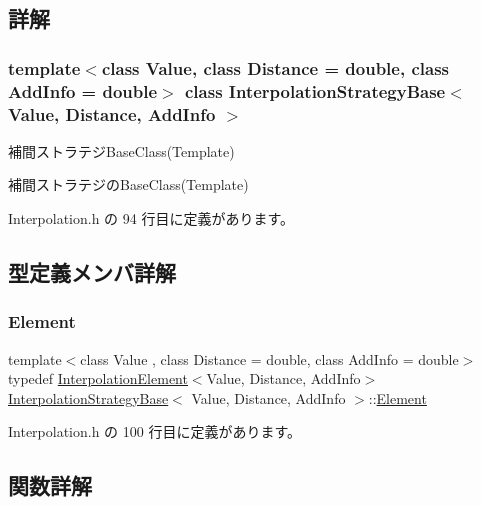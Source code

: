 \subsection{詳解}
\subsubsection*{template$<$class Value, class Distance = double, class Add\+Info = double$>$\newline
class Interpolation\+Strategy\+Base$<$ Value, Distance, Add\+Info $>$}

補間ストラテジ\+Base\+Class(\+Template) 

補間ストラテジの\+Base\+Class(\+Template) 

 Interpolation.\+h の 94 行目に定義があります。



\subsection{型定義メンバ詳解}
\mbox{\label{class_interpolation_strategy_base_abddda7a257538a53ad6030db831aab86}} 
\subsubsection{\texorpdfstring{Element}{Element}}
{\footnotesize\ttfamily template$<$class Value , class Distance  = double, class Add\+Info  = double$>$ \\
typedef \mbox{\hyperlink{class_interpolation_element}{Interpolation\+Element}}$<$Value, Distance, Add\+Info$>$ \mbox{\hyperlink{class_interpolation_strategy_base}{Interpolation\+Strategy\+Base}}$<$ Value, Distance, Add\+Info $>$\+::\mbox{\hyperlink{class_interpolation_strategy_base_abddda7a257538a53ad6030db831aab86}{Element}}}



 Interpolation.\+h の 100 行目に定義があります。



\subsection{関数詳解}
\mbox{\label{class_interpolation_strategy_base_a980a4c1dbf4ebfc094b0cd7edc256efe}} 
